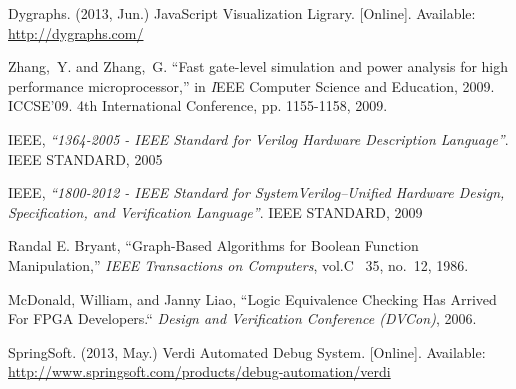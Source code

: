 \begin{thebibliography}{10}
\BIBentryALTinterwordspacing
Dygraphs. (2013, Jun.) {JavaScript Visualization Ligrary}. [Online]. Available:
  \url{http://dygraphs.com/}
\BIBentrySTDinterwordspacing


Zhang,~Y. and Zhang,~G. ``Fast gate-level simulation and power analysis for high performance microprocessor,'' in {\emph IEEE Computer Science and Education, 2009. ICCSE'09. 4th International Conference}, pp. 1155-1158, 2009.


  IEEE,
  \emph{``1364-2005 - IEEE Standard for Verilog Hardware Description
  Language''}.
	IEEE STANDARD,
	2005

  IEEE,
	\emph{``1800-2012 - IEEE Standard for SystemVerilog--Unified Hardware Design,
  Specification, and Verification Language''}.
	IEEE STANDARD,
	2009

Randal E. Bryant,
  ``Graph-Based Algorithms for Boolean Function Manipulation,'' \emph{IEEE Transactions on Computers}, vol.C ~35, no.~12, 1986.

McDonald, William, and Janny Liao,
	``Logic Equivalence Checking Has Arrived For FPGA Developers.`` \emph{Design and Verification Conference (DVCon)}, 2006.

\BIBentryALTinterwordspacing
SpringSoft. (2013, May.) {Verdi Automated Debug System}. [Online]. Available:
  \url{http://www.springsoft.com/products/debug-automation/verdi}
\BIBentrySTDinterwordspacing


\end{thebibliography}

